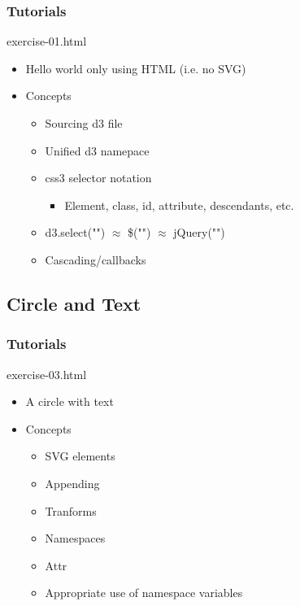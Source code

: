 \documentclass{beamer}
\begin{document}
\begin{frame}
    \frametitle{Tutorials}
    \begin{block}{exercise-01.html}
        \begin{itemize}
            \pause
            \item  Hello world only using HTML (i.e. no SVG)
            \pause
            \item  Concepts
            \begin{itemize}
                \pause
    			\item Sourcing d3 file 
                \pause
                \item Unified d3 namepace
                \pause
                \item css3 selector notation
                \pause
                \begin{itemize}
                    \item Element, class, id, attribute, descendants, etc.
                \end{itemize}
                \pause
                \item d3.select("") $\approx$ \$("") $\approx$ jQuery("")
                \pause
                \item Cascading/callbacks
            \end{itemize}
        \end{itemize}
    \end{block}
\end{frame}


\subsection{Circle and Text}

\begin{frame}
    \frametitle{Tutorials}
    \begin{block}{exercise-03.html}
        \begin{itemize}
            \pause
            \item A circle with text
            \pause
            \item Concepts
            \begin{itemize}
                \pause
                \item SVG elements
                \pause
                \item Appending
                \pause
                \item Tranforms
                \pause
                \item Namespaces
                \pause
                \item Attr
                \pause
                \item Appropriate use of namespace variables
            \end{itemize}
        \end{itemize}
    \end{block}
\end{frame}
\end{document}
